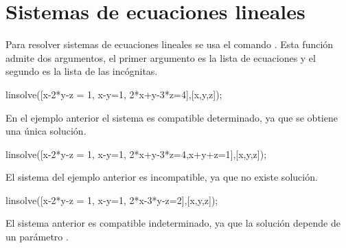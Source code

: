 
\section{Sistemas de ecuaciones lineales}

Para resolver sistemas de ecuaciones lineales se usa el
comando . Esta función admite dos argumentos,
el primer argumento es la lista de ecuaciones y el segundo es
la lista de las incógnitas.
\begin{maximai}
 linsolve([x-2*y-z = 1, x-y=1, 2*x+y-3*z=4],[x,y,z]);
\end{maximai}\begin{maximao}
 \left[ x={{4}\over{3}} , y={{1}\over{3}} , z=-{{1}\over{3}}
 \right]
\end{maximao}
En el ejemplo anterior el sistema es compatible determinado, ya
que se obtiene una única solución.
\begin{maximai}
 linsolve([x-2*y-z = 1, x-y=1, 2*x+y-3*z=4,x+y+z=1],[x,y,z]);
\end{maximai}\begin{maximao}
 \left[\  \right]
\end{maximao}
El sistema del ejemplo anterior es incompatible, ya que no existe
solución.
\begin{maximai}
 linsolve([x-2*y-z = 1, x-y=1, 2*x-3*y-z=2],[x,y,z]);
\end{maximai}\begin{maximao}
 \left[ x=1-{\it \%r}_{1} , y=-{\it \%r}_{1} , z={\it \%r}_{1}
 \right]
\end{maximao}
El sistema anterior es compatible indeterminado, ya que la solución
depende de un parámetro .
